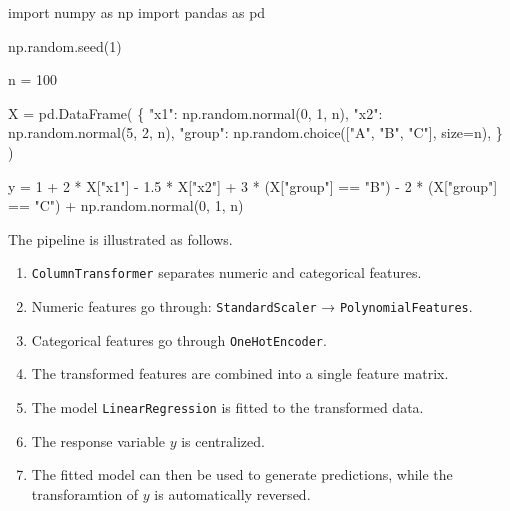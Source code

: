 \documentclass[
  letterpaper,
  DIV=11,
  numbers=noendperiod]{scrreprt}
\newenvironment{Shaded}{\begin{snugshade}}{\end{snugshade}}
\newcommand{\DecValTok}[1]{\textcolor[rgb]{0.68,0.00,0.00}{#1}}
\newcommand{\FloatTok}[1]{\textcolor[rgb]{0.68,0.00,0.00}{#1}}
\newcommand{\ImportTok}[1]{\textcolor[rgb]{0.00,0.46,0.62}{#1}}
\newcommand{\NormalTok}[1]{\textcolor[rgb]{0.00,0.23,0.31}{#1}}
\newcommand{\OperatorTok}[1]{\textcolor[rgb]{0.37,0.37,0.37}{#1}}
\newcommand{\StringTok}[1]{\textcolor[rgb]{0.13,0.47,0.30}{#1}}
\providecommand{\tightlist}{%
  \setlength{\itemsep}{0pt}\setlength{\parskip}{0pt}}
\theoremstyle{definition}
\theoremstyle{definition}
\theoremstyle{plain}
\theoremstyle{plain}
\theoremstyle{remark}
\begin{document}
\begin{Shaded}
\begin{Highlighting}[]
\ImportTok{import}\NormalTok{ numpy }\ImportTok{as}\NormalTok{ np}
\ImportTok{import}\NormalTok{ pandas }\ImportTok{as}\NormalTok{ pd}

\NormalTok{np.random.seed(}\DecValTok{1}\NormalTok{)}

\NormalTok{n }\OperatorTok{=} \DecValTok{100}

\NormalTok{X }\OperatorTok{=}\NormalTok{ pd.DataFrame(}
\NormalTok{    \{}
        \StringTok{"x1"}\NormalTok{: np.random.normal(}\DecValTok{0}\NormalTok{, }\DecValTok{1}\NormalTok{, n),}
        \StringTok{"x2"}\NormalTok{: np.random.normal(}\DecValTok{5}\NormalTok{, }\DecValTok{2}\NormalTok{, n),}
        \StringTok{"group"}\NormalTok{: np.random.choice([}\StringTok{"A"}\NormalTok{, }\StringTok{"B"}\NormalTok{, }\StringTok{"C"}\NormalTok{], size}\OperatorTok{=}\NormalTok{n),}
\NormalTok{    \}}
\NormalTok{)}

\NormalTok{y }\OperatorTok{=} \DecValTok{1} \OperatorTok{+} \DecValTok{2} \OperatorTok{*}\NormalTok{ X[}\StringTok{"x1"}\NormalTok{] }\OperatorTok{{-}} \FloatTok{1.5} \OperatorTok{*}\NormalTok{ X[}\StringTok{"x2"}\NormalTok{] }\OperatorTok{+} \DecValTok{3} \OperatorTok{*}\NormalTok{ (X[}\StringTok{"group"}\NormalTok{] }\OperatorTok{==} \StringTok{"B"}\NormalTok{) }\OperatorTok{{-}} \DecValTok{2} \OperatorTok{*}\NormalTok{ (X[}\StringTok{"group"}\NormalTok{] }\OperatorTok{==} \StringTok{"C"}\NormalTok{) }\OperatorTok{+}\NormalTok{ np.random.normal(}\DecValTok{0}\NormalTok{, }\DecValTok{1}\NormalTok{, n)}
\end{Highlighting}
\end{Shaded}

The pipeline is illustrated as follows.

\begin{enumerate}
\def\labelenumi{\arabic{enumi}.}
\tightlist
\item
  \texttt{ColumnTransformer} separates numeric and categorical features.
\item
  Numeric features go through: \texttt{StandardScaler} →
  \texttt{PolynomialFeatures}.
\item
  Categorical features go through \texttt{OneHotEncoder}.
\item
  The transformed features are combined into a single feature matrix.
\item
  The model \texttt{LinearRegression} is fitted to the transformed data.
\item
  The response variable \(y\) is centralized.
\item
  The fitted model can then be used to generate predictions, while the
  transforamtion of \(y\) is automatically reversed.
\end{enumerate}
\end{document}
